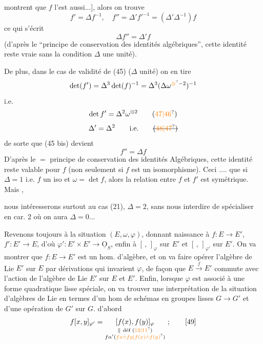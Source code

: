 montrent que $f$ l'est aussi...], alors  on trouve
\[
 f'=\Delta f^{-1},\quad f''=\Delta' f'^{-1}=(\Delta'\Delta^{-1})f \tag*{(45)}
\]
ce qui s'écrit
\[
 \Delta f''=\Delta' f \tag*{(45 bis)}
\]
(d'après le ``principe de conservation des identités algébriques'', cette  identité reste vraie sans la condition  $\Delta$ une unité).

De plus, dans le cas de validité de (45) ($\Delta$ unité) on en tire
\[
 \det(f')=\Delta^3\det(f)^{-1}=\Delta^3(\Delta\omega^{\unsure{\otimes}{-2}})^{-1}
\]
i.e.
\[
 \det f'=\Delta^2\omega^{\otimes2} \tag*{(\unsure{47|46})}
\]
\[
 \Delta'=\Delta^2\qquad\text{i.e.} \tag*{\deleted{(\unsure{48|47})}}
\]
 de sorte que (45 bis) devient
\[
 f''=\Delta f \tag*{(48)}
\]
D'après le $=$ principe de conservation des identités Algébriques, cette identité reste valable pour  $f$ (non seulement si $f$ est un isomorphisme). Ceci   .... que si $\Delta=1$ i.e. $f$ un iso et $\omega=\det f$, alors la relation entre $f$ et $f'$ est symétrique. Mais ,

nous intéresserons surtout au cas (21),  $\Delta=2$, sans nous interdire de spécialiser en car. 2 où on aura $\Delta=0$...

Revenons toujours à la situation $(E,\omega,\varphi)$, donnant naissance à $f:E\to E'$, $f':E'\to E$, d'où $\varphi':E'\times E'\longrightarrow\underline{\mathrm O}_S$, enfin à $[\, ,\,]_\varphi$ sur $E'$ et $[\, ,\,]_{\varphi'}$ sur $E'$. On va montrer que $f:E\to E'$ est un hom. d'algèbre, et  on va faire opérer l'algèbre de Lie $E'$ sur $E$ par dérivations  qui invarient $\varphi$, de façon que $E\xrightarrow{f}E'$ commute avec l'action de l'algèbre de Lie $E'$ sur $E$ et $E'$. Enfin, lorsque $\varphi$  est associé à une forme quadratique lisse spéciale, on va trouver une interprétation de la situation d'algèbres de Lie en termes d'un hom de schémas en groupes lisses $G\to G'$ et d'une opération de $G'$ sur $G$.  d'abord
\[
 f[x,y]_{\varphi'}=
 \underset{\substack{\parallel\ \text{déf }(\unsure{12|11})\\ f\alpha'(\unsure{fx\wedge fy|f(x)\wedge f(y)})}}{[f(x),f(y)]_\varphi}\ ; \tag*{[49]}
\]


